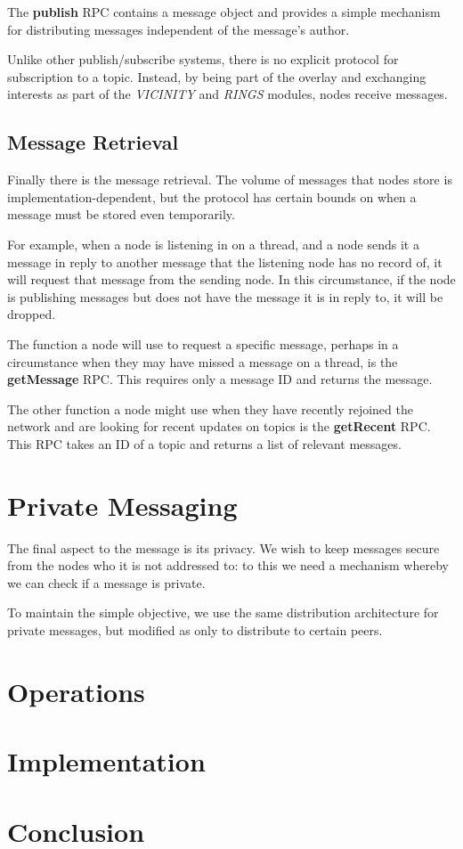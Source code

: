 \documentclass[10pt,a4paper,onecolumn]{article}
\begin{document}
The \textbf{publish} RPC contains a message object and provides a simple mechanism for distributing messages independent of the message's author.

Unlike other publish/subscribe systems, there is no explicit protocol for subscription to a topic. Instead, by being part of the overlay and exchanging interests as part of the \emph{VICINITY} and \emph{RINGS} modules, nodes receive messages. 

\subsection*{Message Retrieval}
Finally there is the message retrieval. The volume of messages that nodes store is implementation-dependent, but the protocol has certain bounds on when a message must be stored even temporarily. 

For example, when a node is listening in on a thread, and a node sends it a message in reply to another message that the listening node has no record of, it will request that message from the sending node. In this circumstance, if the node is publishing messages but does not have the message it is in reply to, it will be dropped.

The function a node will use to request a specific message, perhaps in a circumstance when they may have missed a message on a thread, is the \textbf{getMessage} RPC. This requires only a message ID and returns the message. 

The other function a node might use when they have recently rejoined the network and are looking for recent updates on topics is the \textbf{getRecent} RPC. This RPC takes an ID of a topic and returns a list of relevant messages.

\section{Private Messaging}
The final aspect to the message is its privacy. We wish to keep messages secure from the nodes who it is not addressed to: to this we need a mechanism whereby we can check if a message is private.

To maintain the simple objective, we use the same distribution architecture for private messages, but modified as only to distribute to certain peers. 

\section{Operations}


\section{Implementation}
\label{impl}


\section{Conclusion}


\end{document}
